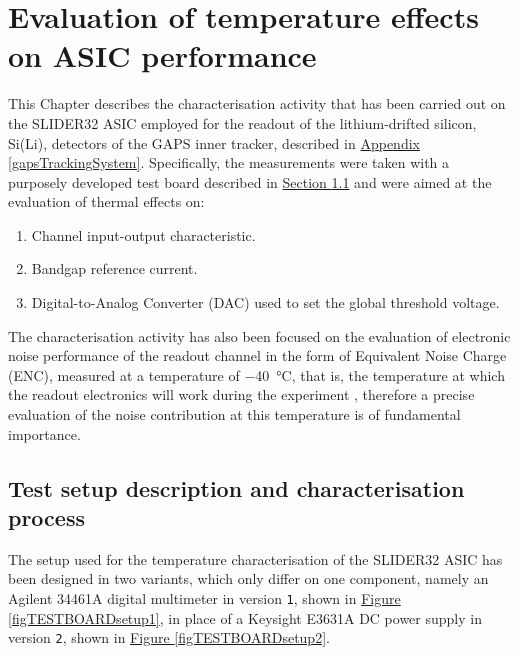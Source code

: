 \chapter{Evaluation of temperature effects on ASIC performance} \label{ch1}

This Chapter describes the characterisation activity that has been carried out on the SLIDER32 ASIC employed for the readout of the lithium-drifted silicon, Si(Li), detectors of the GAPS inner tracker, described in \hyperref[gapsTrackingSystem]{Appendix \ref{gapsTrackingSystem}}. Specifically, the measurements were taken with a purposely developed test board described in \hyperref[testboardsetup]{Section \ref{testboardsetup}} and were aimed at the evaluation of thermal effects on:

\begin{enumerate}
    \bfseries
    \itemsep0em 
    \item Channel input-output characteristic.
    \item Bandgap reference current.
    \item Digital-to-Analog Converter (DAC) used to set the global threshold voltage.
\end{enumerate}

\par
The characterisation activity has also been focused on the evaluation of electronic noise performance of the readout channel in the form of Equivalent Noise Charge (ENC), measured at a temperature of \SI{-40}{\celsius}, that is, the temperature at which the readout electronics will work during the experiment \cite{re_2022_a}, therefore a precise evaluation of the noise contribution at this temperature is of fundamental importance.


\section[Test setup description and characterisation process]{Test setup description and characterisation\\ process} \label{testboardsetup}

The setup used for the temperature characterisation of the SLIDER32 ASIC has been designed in two variants, which only differ on one component, namely an Agilent 34461A digital multimeter in version \texttt{1}, shown in \hyperref[figTESTBOARDsetup1]{Figure \ref{figTESTBOARDsetup1}}, in place of a Keysight E3631A DC power supply in version \texttt{2}, shown in \hyperref[figTESTBOARDsetup2]{Figure \ref{figTESTBOARDsetup2}}.

